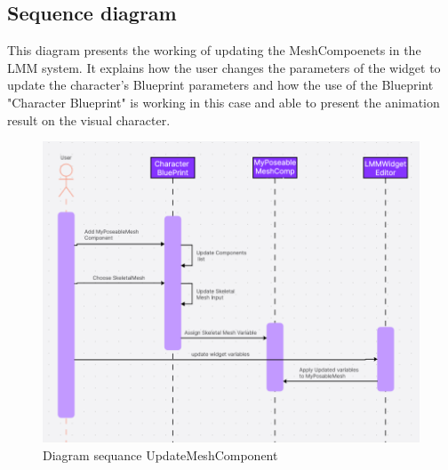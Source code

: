 \documentclass[12pt]{book}
\begin{document}
\newpage

\subsection{Sequence diagram}
This diagram presents the working of updating the MeshCompoenets in the LMM system. It explains how the user changes the parameters of the widget to update the character's Blueprint parameters and how the use of the Blueprint "Character Blueprint" is working in this case and able to present the animation result on the visual character.
\begin{figure}[!h]
    \centering
    \includegraphics[scale=0.8]{Figures/uml/UpdateMeshComponent.png}
    \caption{Diagram sequance UpdateMeshComponent}
    \label{Diagram sequance UpdateMeshComponent}
\end{figure}

\newpage
\end{document}
